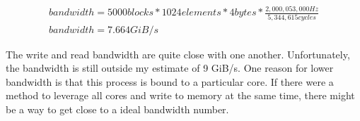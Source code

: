 \documentclass[paper=a4, fontsize=11pt]{scrartcl}
\numberwithin{equation}{section}        %
\numberwithin{figure}{section}          %
\numberwithin{table}{section}               %
\begin{document}
\begin{gather}
bandwidth = 5000 blocks * 1024 elements * 4 bytes * \frac{2,000,053,000 Hz}{5,344,615 cycles} \\
bandwidth = 7.664 GiB/s
\end{gather}

The write and read bandwidth are quite close with one another.  Unfortunately, the bandwidth is still outside my estimate of 9 GiB/s.  One reason for lower bandwidth is that this process is bound to a particular core.  If there were a method to leverage all cores and write to memory at the same time, there might be a way to get close to a ideal bandwidth number.












































\end{document}
